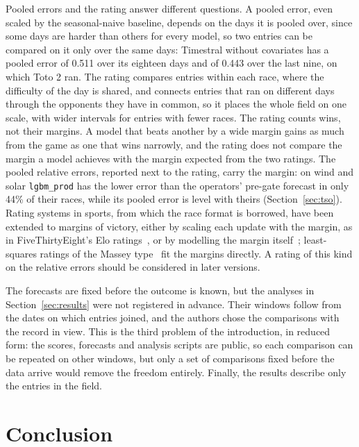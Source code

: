 \documentclass[11pt,a4paper]{article}
\newcommand{\m}[1]{\texttt{#1}}
\begin{document}
Pooled errors and the rating answer different questions. A pooled error, even scaled by the seasonal-naive baseline,
depends on the days it is pooled over, since some days are harder than others for every model, so two entries can be
compared on it only over the same days: Timestral without covariates has a pooled error of 0.511 over its eighteen
days and of 0.443 over the last nine, on which Toto 2 ran. The rating compares entries within each race, where the difficulty of the day is shared,
and connects entries that ran on different days through the opponents they have in common, so it places the whole
field on one scale, with wider intervals for entries with fewer races. The rating counts wins, not their margins. A model that beats another by a wide margin gains as much from the game as
one that wins narrowly, and the rating does not compare the margin a model achieves with the margin expected from the
two ratings. The pooled relative errors, reported next to the rating, carry the margin: on wind and solar \m{lgbm\_prod}
has the lower error than the operators' pre-gate forecast in only 44\% of their races, while its pooled error is level
with theirs (Section~\ref{sec:tso}). Rating systems in sports, from which the race format is borrowed, have been extended to
margins of victory, either by scaling each update with the margin, as in FiveThirtyEight's Elo
ratings~\cite{fivethirtyeight}, or by modelling the margin itself~\cite{kovalchik,szczecinski}; least-squares ratings
of the Massey type~\cite{massey} fit the margins directly. A rating of this kind on the relative errors should be
considered in later versions.

The forecasts are fixed before the outcome is known, but the analyses in Section~\ref{sec:results} were not
registered in advance. Their windows follow from the dates on which entries joined, and the authors chose the
comparisons with the record in view. This is the third problem of the introduction, in reduced form: the scores,
forecasts and analysis scripts are public, so each comparison can be repeated on other windows, but only a set of
comparisons fixed before the data arrive would remove the freedom entirely. Finally, the results describe only the
entries in the field.

\section{Conclusion}
\end{document}

